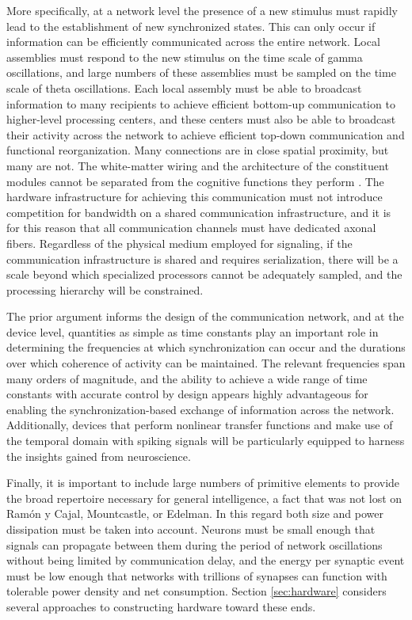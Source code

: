 More specifically, at a network level the presence of a new stimulus must rapidly lead to the establishment of new synchronized states. This can only occur if information can be efficiently communicated across the entire network. Local assemblies must respond to the new stimulus on the time scale of gamma oscillations, and large numbers of these assemblies must be sampled on the time scale of theta oscillations. Each local assembly must be able to broadcast information to many recipients to achieve efficient bottom-up communication to higher-level processing centers, and these centers must also be able to broadcast their activity across the network to achieve efficient top-down communication and functional reorganization. Many connections are in close spatial proximity, but many are not. The white-matter wiring and the architecture of the constituent modules cannot be separated from the cognitive functions they perform \cite{bosp2015}. The hardware infrastructure for achieving this communication must not introduce competition for bandwidth on a shared communication infrastructure, and it is for this reason that all communication channels must have dedicated axonal fibers. Regardless of the physical medium employed for signaling, if the communication infrastructure is shared and requires serialization, there will be a scale beyond which specialized processors cannot be adequately sampled, and the processing hierarchy will be constrained.

The prior argument informs the design of the communication network, and at the device level, quantities as simple as time constants play an important role in determining the frequencies at which synchronization can occur and the durations over which coherence of activity can be maintained. The relevant frequencies span many orders of magnitude, and the ability to achieve a wide range of time constants with accurate control by design appears highly advantageous for enabling the synchronization-based exchange of information across the network. Additionally, devices that perform nonlinear transfer functions and make use of the temporal domain with spiking signals will be particularly equipped to harness the insights gained from neuroscience. 

Finally, it is important to include large numbers of primitive elements to provide the broad repertoire necessary for general intelligence, a fact that was not lost on Ram\'{o}n y Cajal, Mountcastle, or Edelman. In this regard both size and power dissipation must be taken into account. Neurons must be small enough that signals can propagate between them during the period of network oscillations without being limited by communication delay, and the energy per synaptic event must be low enough that networks with trillions of synapses can function with tolerable power density and net consumption. Section \ref{sec:hardware} considers several approaches to constructing hardware toward these ends.

